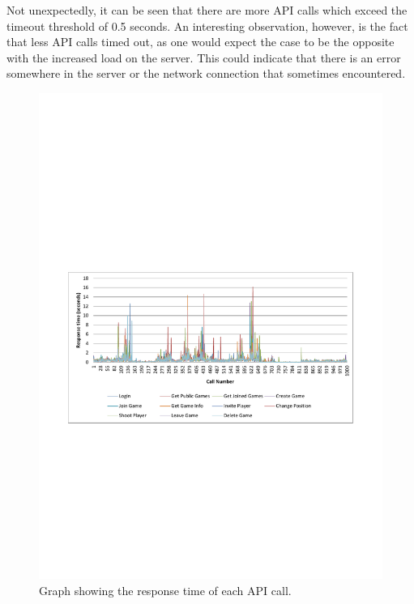 Not unexpectedly, it can be seen that there are more API calls which exceed the timeout threshold of 0.5 seconds. An interesting observation, however, is the fact that less API calls timed out, as one would expect the case to be the opposite with the increased load on the server. This could indicate that there is an error somewhere in the server or the network connection that sometimes encountered.\\







\begin{figure}[H]
  \centering
  \includegraphics[width=\textwidth, clip=true, trim=0 22em 0 22em]{billeder/loadgraph.pdf}  
  \caption{Graph showing the response time of each API call.}
  \label{fig:loadgraph}
\end{figure}

